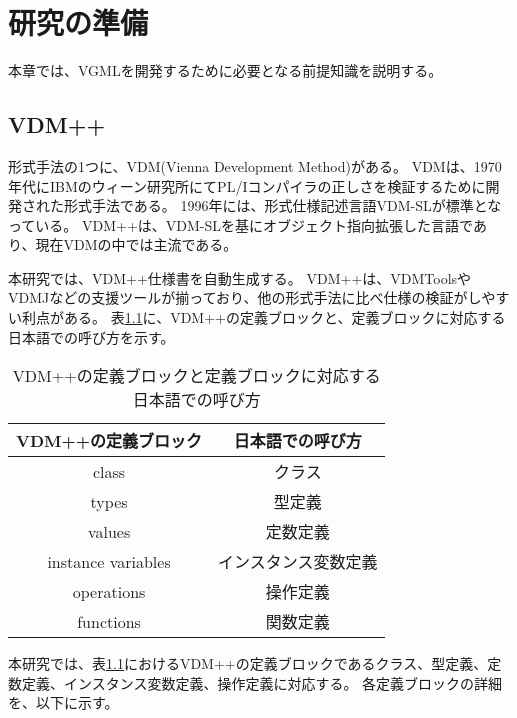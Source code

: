 \chapter{研究の準備}
\label{cha:Preparation}

本章では、VGMLを開発するために必要となる前提知識を説明する。

\section{VDM++}
\label{sec:vdm}

形式手法の1つに、VDM(Vienna Development Method)がある\cite{}。
VDMは、1970年代にIBMのウィーン研究所にてPL/Iコンパイラの正しさを検証するために開発された形式手法である。
1996年には、形式仕様記述言語VDM-SLが標準となっている\cite{}。
VDM++は、VDM-SLを基にオブジェクト指向拡張した言語であり、現在VDMの中では主流である。

本研究では、VDM++仕様書を自動生成する。
VDM++は、VDMTools\cite{}やVDMJ\cite{}などの支援ツールが揃っており、他の形式手法に比べ仕様の検証がしやすい利点がある。
表\ref{table:vdm_block}に、VDM++の定義ブロックと、定義ブロックに対応する日本語での呼び方を示す。

\begin{table}[t]
    \begin{center}      
        \caption{VDM++の定義ブロックと定義ブロックに対応する日本語での呼び方}\label{table:vdm_block}
        \begin{tabular}{c|c}
        VDM++の定義ブロック  & 日本語での呼び方　\\ \hline \hline
        class & クラス \\ \hline
        types	 & 型定義 \\ \hline
        values  & 定数定義 \\ \hline
        instance variables & インスタンス変数定義 \\ \hline
        operations & 操作定義 \\ \hline 
        functions  & 関数定義 \\ \hline 
        \end{tabular}
    \end{center}
\end{table}

本研究では、表\ref{table:vdm_block}におけるVDM++の定義ブロックであるクラス、型定義、定数定義、インスタンス変数定義、操作定義に対応する。
各定義ブロックの詳細を、以下に示す。

